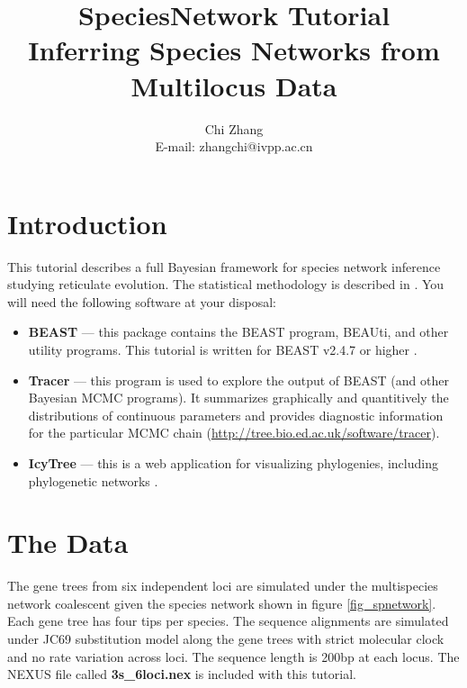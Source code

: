 \documentclass[11pt]{article}
\begin{document}
\title{SpeciesNetwork Tutorial \\
\large Inferring Species Networks from Multilocus Data}
\author{Chi Zhang \\
E-mail: zhangchi@ivpp.ac.cn}
\maketitle

\section*{Introduction}

This tutorial describes a full Bayesian framework for species network inference studying reticulate evolution. The statistical methodology is described in \citet{Zhang:2017gq}.
You will need the following software at your disposal:
\begin{itemize}
\item \textbf{BEAST} --- this package contains the BEAST program, BEAUti, and other utility programs. This tutorial is written for BEAST v2.4.7 or higher \citep[\url{http://beast2.org},][]{Bouckaert:2014iz}.
\item \textbf{Tracer} --- this program is used to explore the output of BEAST (and other Bayesian MCMC programs). It summarizes graphically and quantitively the distributions of continuous parameters and provides diagnostic information for the particular MCMC chain (\url{http://tree.bio.ed.ac.uk/software/tracer}).
\item \textbf{IcyTree} --- this is a web application for visualizing phylogenies, including phylogenetic networks \citep[\url{icytree.org};][]{Vaughan:2017fu}.
\end{itemize}

\section*{The Data}

The gene trees from six independent loci are simulated under the multispecies network coalescent \citep[MSNC;][]{Yu:2014dt} given the species network shown in figure \ref{fig_spnetwork}. Each gene tree has four tips per species. The sequence alignments are simulated under JC69 substitution model \citep{Jukes:1969wx} along the gene trees with strict molecular clock and no rate variation across loci. The sequence length is 200bp at each locus. The NEXUS file called \textbf{3s\_6loci.nex} is included with this tutorial.
\end{document}
